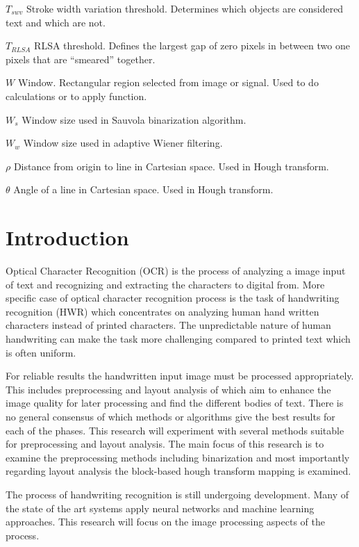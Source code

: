 \documentclass{article}
\begin{document}
\begin{abbrv}
    \item[$T_{swv}$] Stroke width variation threshold. Determines which objects are considered text and which are not.
    \item[$T_{RLSA}$] RLSA threshold. Defines the largest gap of zero pixels in between two one pixels that are ``smeared'' together.
    \item[$W$] Window. Rectangular region selected from image or signal. Used to do calculations or to apply function.
    \item[$W_s$] Window size used in Sauvola binarization algorithm.
    \item[$W_w$] Window size used in adaptive Wiener filtering.
    \item[$\rho$] Distance from origin to line in Cartesian space. Used in Hough transform.
    \item[$\theta$] Angle of a line in Cartesian space. Used in Hough transform.
   \end{abbrv}

   \newpage
   \section{Introduction}
    Optical Character Recognition (OCR) is the process of analyzing a image input of  text and recognizing and extracting the characters to digital from. More specific case of optical character recognition process is the task of handwriting recognition (HWR) which concentrates on analyzing human hand written characters instead of printed characters. The unpredictable nature of human handwriting can make the task more challenging compared to printed text which is often uniform.

    For reliable results the handwritten input image must be processed appropriately. This includes preprocessing and layout analysis of which aim to enhance the image quality for later processing and find the different bodies of text. There is no general consensus of which methods or algorithms give the best results for each of the phases. This research will experiment with several methods suitable for preprocessing and layout analysis. The main focus of this research is to examine the preprocessing methods including binarization and most importantly regarding layout analysis the block-based hough transform mapping is examined.

    The process of handwriting recognition is still undergoing development. Many of the state of the art systems apply neural networks and machine learning approaches. This research will focus on the image processing aspects of the process.
\end{document}
